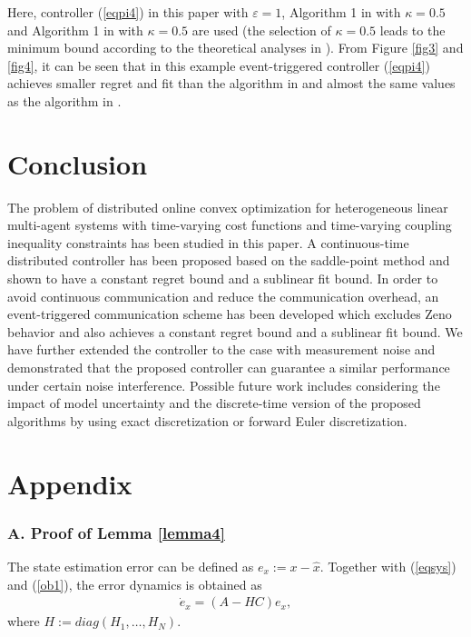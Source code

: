 \documentclass[final,5p,times,twocolumn,authoryear]{elsarticle}
\begin{document}
\begin{example}
	
	Here,  controller (\ref{eqpi4}) in this paper with $\varepsilon=1$,  Algorithm 1 in \citet{li2022} with $\kappa=0.5$ and Algorithm 1 in \citet{yi2020} with $\kappa=0.5$ are used (the selection of $\kappa=0.5$ leads to the minimum bound according to the theoretical analyses in \citet{li2022,yi2020}). From Figure \ref{fig3} and \ref{fig4}, it can be seen that in this example event-triggered controller (\ref{eqpi4}) achieves smaller  regret and fit than the algorithm in \citet{li2022} and almost the same values as the algorithm in \citet{yi2020}.
	
	
	
\end{example}

\section{Conclusion}\label{res}	
	The problem of distributed online convex optimization for heterogeneous linear multi-agent systems with time-varying cost functions and time-varying coupling inequality constraints has been studied in this paper. A  continuous-time distributed controller has been proposed based on the saddle-point method and shown to have a constant regret bound and a sublinear fit bound. In order to avoid continuous communication and reduce the communication overhead, an event-triggered communication scheme has been developed which excludes Zeno behavior and also achieves a constant regret bound and a sublinear fit bound. 
	We have further extended the  controller to the case with measurement noise and demonstrated that the proposed  controller can guarantee a similar performance under certain noise interference.
	Possible future work includes   considering the impact of model uncertainty and the discrete-time version of the proposed algorithms by using exact discretization or forward Euler discretization.
\section*{Appendix}
	

	
	\subsubsection*{{A.} Proof of Lemma \ref{lemma4}}\label{ple4}
	
	
	The state estimation error can be defined as $e_x:=x-\hat{x}$. 
	Together with (\ref{eqsys}) and (\ref{ob1}), the error dynamics is obtained as 
	\begin{align}
		\dot{e}_x=(A-HC)e_x,\label{ex2}
	\end{align}
	where $H := diag(H_1,\dots,H_N)$.
		
\end{document}

